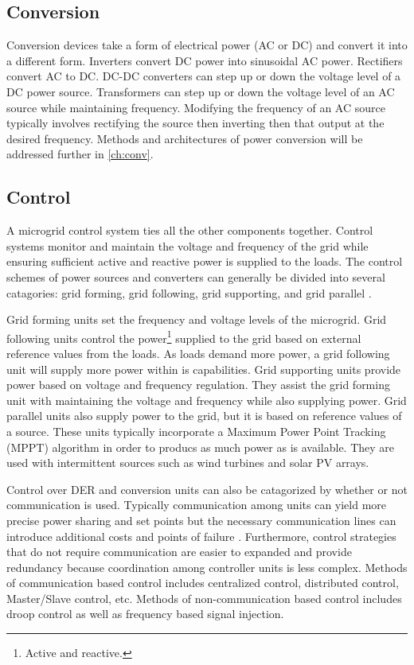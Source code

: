 \subsection{Conversion}
Conversion devices take a form of electrical power (AC or DC) and convert it into a different form. Inverters convert DC power into sinusoidal AC power. Rectifiers convert AC to DC. DC-DC converters can step up or down the voltage level of a DC power source. Transformers can step up or down the voltage level of an AC source while maintaining frequency. Modifying the frequency of an AC source typically involves rectifying the source then inverting then that output at the desired frequency. Methods and architectures of power conversion will be addressed further in \autoref{ch:conv}.

\subsection{Control}
A microgrid control system ties all the other components together. Control systems monitor and maintain the voltage and frequency of the grid while ensuring sufficient active and reactive power is supplied to the loads. The control schemes of power sources and converters can generally be divided into several catagories: grid forming, grid following, grid supporting, and grid parallel \cite{Ortjohann2012, Engler, Strauss2003}. 

Grid forming units set the frequency and voltage levels of the microgrid. Grid following units control the power\footnote{Active and reactive.} supplied to the grid based on external reference values from the loads. As loads demand more power, a grid following unit will supply more power within is capabilities. Grid supporting units provide power based on voltage and frequency regulation. They assist the grid forming unit with maintaining the voltage and frequency while also supplying power. Grid parallel units also supply power to the grid, but it is based on reference values of a source. These units typically incorporate a Maximum Power Point Tracking (MPPT) algorithm in order to producs as much power as is available. They are used with intermittent sources such as wind turbines and solar PV arrays. 

Control over DER and conversion units can also be catagorized by whether or not communication is used. Typically communication among units can yield more precise power sharing and set points but the necessary communication lines can introduce additional costs and points of failure \cite{Vandoorn2013}. Furthermore, control strategies that do not require communication are easier to expanded and provide redundancy because coordination among controller units is less complex. Methods of communication based control includes centralized control, distributed control, Master/Slave control, etc. Methods of non-communication based control includes droop control as well as frequency based signal injection.

